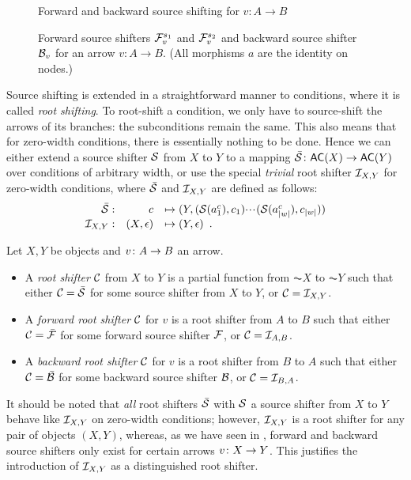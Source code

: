 \begin{figure}[t]
\centering

\caption{Forward and backward source shifting for $v:A\to B$}
\end{figure}

\begin{figure}
\centering

\caption{Forward source shifters $\mathcal{F}_v^{s_1}$ and $\mathcal{F}_v^{s_2}$ and backward source shifter $\mathcal{B}_v$ for an arrow $v:A\to B$. (All morphisms $a$ are the identity on nodes.)}
\end{figure}

Source shifting is extended in a straightforward manner to conditions, where it is called \emph{root shifting}. To root-shift a condition, we only have to source-shift the arrows of its branches: the subconditions remain the same. This also means that for zero-width conditions, there is essentially nothing to be done. Hence we can either extend a source shifter $\mathcal{S}$ from $X$ to $Y$ to a mapping $\bar\cS\of \AC X\to \AC Y$ over conditions of arbitrary width, or use the special \emph{trivial} root shifter $\mathcal{I}_{X,Y}$ for zero-width conditions, where $\bar{\mathcal{S}}$ and $\mathcal{I}_{X,Y}$ are defined as follows:
\[\begin{array}{rrl}
\bar{\mathcal{S}}: & c & \mapsto (Y,(\mathcal{S}(a^c_1),c_1){\cdotp\mkern-2mu\cdotp\mkern-2mu\cdotp\mkern1mu} (\mathcal{S}(a^c_{|w|}),c_{|w|})) \\
\mathcal{I}_{X,Y}: & (X,\epsilon) & \mapsto (Y,\epsilon) \enspace.
\end{array}\]

\begin{definition}
Let $X,Y$ be objects and $v\colon A\rightarrow B$ an arrow.
\begin{itemize}[topsep=\smallskipamount]
\item A \emph{root shifter} $\mathcal{C}$ from $X$ to $Y$ is a partial function from $\AC X$ to $\AC Y$ such that either $\mathcal{C}=\bar{\mathcal{S}}$ for some source shifter from $X$ to $Y$, or $\mathcal{C}=\mathcal{I}_{X,Y}$.

\item A \emph{forward root shifter} $\mathcal{C}$ for $v$ is a root shifter from $A$ to $B$ such that either $\mathcal{C}=\bar{\mathcal{F}}$ for some forward source shifter $\mathcal{F}$, or $\mathcal{C}=\mathcal{I}_{A,B}$.

\item A \emph{backward root shifter} $\mathcal{C}$ for $v$ is a root shifter from $B$ to $A$ such that either $\mathcal{C}=\bar{\mathcal{B}}$ for some backward source shifter $\mathcal{B}$, or $\mathcal{C}=\mathcal{I}_{B,A}$.
\end{itemize}
\end{definition}
%
It should be noted that \emph{all} root shifters $\bar{\mathcal{S}}$ with $\mathcal{S}$ a source shifter from $X$ to $Y$ behave like $\mathcal{I}_{X,Y}$ on zero-width conditions; however, $\mathcal{I}_{X,Y}$ is a root shifter for any pair of objects $(X,Y)$, whereas, as we have seen in , forward and backward source shifters only exist for certain arrows $v\colon X \rightarrow Y$. This justifies the introduction of $\mathcal{I}_{X,Y}$ as a  distinguished root shifter.

